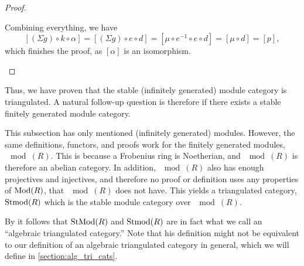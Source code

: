 \begin{proof}
\begin{enumerate}[label={(\bfseries TR\arabic*)}]
{            Combining everything, we have
            \[
                [(\Sigma g) \circ k \circ \alpha] = [(\Sigma g) \circ e \circ d] =[\mu \circ e^{-1} \circ e \circ d] = [\mu \circ d] = [p],
            \]
            which finishes the proof, as \( [\alpha] \) is an isomorphism. \qedhere
        }
    \end{enumerate}
\end{proof}

Thus, we have proven that the stable (infinitely generated) module category is triangulated. A natural follow-up question is therefore if there exists a stable finitely generated module category.
\begin{remark}
    This subsection has only mentioned (infinitely generated) modules. However, the same definitions, functors, and proofs work for the finitely generated modules, \( \mod(R) \). This is because a Frobenius ring is Noetherian, and \( \mod(R) \) is therefore an abelian category. In addition, \( \mod(R) \) also has enough projectives and injectives, and therefore no proof or definition uses any properties of \( \operatorname{Mod}(R) \), that \( \mod(R) \) does not have. This yields a triangulated category, \( \operatorname{Stmod}(R) \) which is the stable module category over \( \mod(R) \).
\end{remark}

By \cite[Lemma, Section 7.5]{Krause_2007} it follows that \( \operatorname{StMod}(R) \) and \( \operatorname{Stmod}(R) \) are in fact what we call an ``algebraic triangulated category.'' Note that his definition might not be equivalent to our definition of an algebraic triangulated category in general, which we will define in \autoref{section:alg_tri_cats}.
